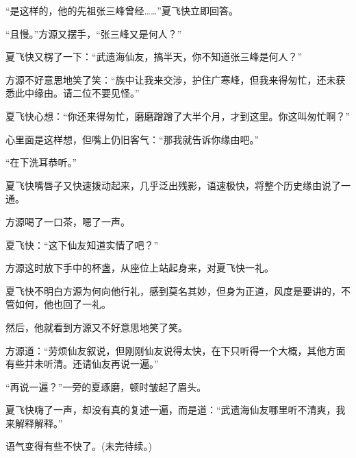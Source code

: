 \begin{this_body}
“是这样的，他的先祖张三峰曾经……”夏飞快立即回答。

“且慢。”方源又摆手，“张三峰又是何人？”

夏飞快又楞了一下：“武遗海仙友，搞半天，你不知道张三峰是何人？”

方源不好意思地笑了笑：“族中让我来交涉，护住广寒峰，但我来得匆忙，还未获悉此中缘由。请二位不要见怪。”

夏飞快心想：“你还来得匆忙，磨磨蹭蹭了大半个月，才到这里。你这叫匆忙啊？”

心里面是这样想，但嘴上仍旧客气：“那我就告诉你缘由吧。”

“在下洗耳恭听。”

夏飞快嘴唇子又快速拨动起来，几乎泛出残影，语速极快，将整个历史缘由说了一通。

方源喝了一口茶，嗯了一声。

夏飞快：“这下仙友知道实情了吧？”

方源这时放下手中的杯盏，从座位上站起身来，对夏飞快一礼。

夏飞快不明白方源为何向他行礼，感到莫名其妙，但身为正道，风度是要讲的，不管如何，他也回了一礼。

然后，他就看到方源又不好意思地笑了笑。

方源道：“劳烦仙友叙说，但刚刚仙友说得太快，在下只听得一个大概，其他方面有些并未听清。还请仙友再说一遍。”

“再说一遍？”一旁的夏琢磨，顿时皱起了眉头。

夏飞快嗨了一声，却没有真的复述一遍，而是道：“武遗海仙友哪里听不清爽，我来解释解释。”

语气变得有些不快了。(未完待续。)

\end{this_body}

